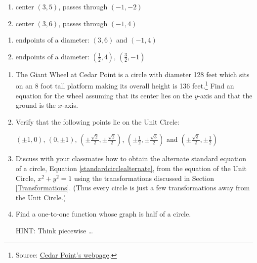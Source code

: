 \documentclass{ximera}
\begin{document}
\begin{multicols}{2}
\begin{enumerate}
\setcounter{enumi}{\value{HW}}

\item center $(3, 5)$,  passes through $(-1, -2)$ \label{buildcirclefirst}

\item  center $(3, 6)$,  passes through  $(-1, 4)$

\setcounter{HW}{\value{enumi}}
\end{enumerate}
\end{multicols}

\begin{multicols}{2}
\begin{enumerate}
\setcounter{enumi}{\value{HW}}

\item  endpoints of a diameter: $(3,6)$ and $(-1,4)$

\item endpoints of a diameter:  $\left( \frac{1}{2}, 4\right)$, $\left(\frac{3}{2}, -1\right)$  \label{buildcirclelast}

\setcounter{HW}{\value{enumi}}
\end{enumerate}
\end{multicols}


\begin{enumerate}
\setcounter{enumi}{\value{HW}}

\item The Giant Wheel at Cedar Point is a circle with diameter 128 feet which sits on an 8 foot tall platform making its overall height is 136 feet.\footnote{Source: \href{http://www.cedarpoint.com/public/park/rides/tranquil/giant_wheel.cfm}{\underline{Cedar Point's webpage}}.}  Find an equation for the wheel assuming that its center lies on the $y$-axis and that the ground is the $x$-axis.
\label{giantwheelcircle}

\item Verify that the following points lie on the Unit Circle:

 $(\pm 1, 0)$, $(0, \pm 1)$, $\left(\pm \frac{\sqrt{2}}{2}, \pm \frac{\sqrt{2}}{2}\right)$, $\left(\pm \frac{1}{2}, \pm \frac{\sqrt{3}}{2}\right)$ and  $\left(\pm \frac{\sqrt{3}}{2}, \pm \frac{1}{2}\right)$


\item \label{circletransunitcircleexercise} Discuss with your classmates how to obtain the alternate standard equation of a circle, Equation \ref{standardcirclealternate}, from the equation of the Unit Circle, $x^2+y^2=1$ using the transformations discussed in Section \ref{Transformations}.  (Thus every circle is just a few transformations away from the Unit Circle.)

\item Find a one-to-one function whose graph is half of a circle. 

HINT:  Think piecewise \ldots

\end{enumerate}
\end{document}
